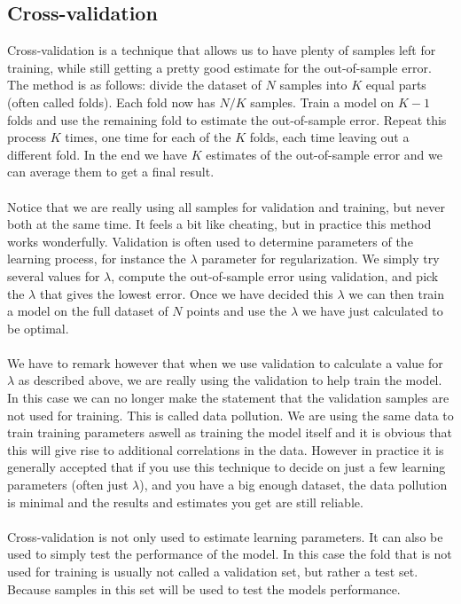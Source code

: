 \subsection{Cross-validation}
Cross-validation\cite{caltechmachinelearning}\cite{kohavi1995study} is a technique that allows us to have plenty of samples left for training, while still getting a pretty good estimate for the out-of-sample error. The method is as follows: divide the dataset of $N$ samples into $K$ equal parts (often called folds). Each fold now has $N/K$ samples. Train a model on $K-1$ folds and use the remaining fold to estimate the out-of-sample error. Repeat this process $K$ times, one time for each of the $K$ folds, each time leaving out a different fold. In the end we have $K$ estimates of the out-of-sample error and we can average them to get a final result.\\ \\
Notice that we are really using all samples for validation and training, but never both at the same time. It feels a bit like cheating, but in practice this method works wonderfully. Validation is often used to determine parameters of the learning process, for instance the $\lambda$ parameter for regularization. We simply try several values for $\lambda$, compute the out-of-sample error using validation, and pick the $\lambda$ that gives the lowest error. Once we have decided this $\lambda$ we can then train a model on the full dataset of $N$ points and use the $\lambda$ we have just calculated to be optimal. \\ \\
We have to remark however that when we use validation to calculate a value for $\lambda$ as described above, we are really using the validation to help train the model. In this case we can no longer make the statement that the validation samples are not used for training. This is called data pollution. We are using the same data to train training parameters aswell as training the model itself and it is obvious that this will give rise to additional correlations in the data. However in practice it is generally accepted that if you use this technique to decide on just a few learning parameters (often just $\lambda$), and you have a big enough dataset, the data pollution is minimal and the results and estimates you get are still reliable. \\ \\
Cross-validation is not only used to estimate learning parameters. It can also be used to simply test the performance of the model. In this case the fold that is not used for training is usually not called a validation set, but rather a test set. Because samples in this set will be used to test the models performance. 

